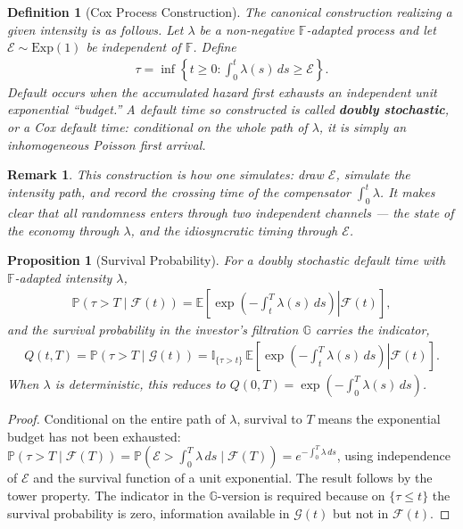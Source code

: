 \documentclass{report}
\theoremstyle{spacedplain}
\newtheorem{proposition}[theorem]{Proposition}
\theoremstyle{spaceddefinition}
\newtheorem{definition}[theorem]{Definition}
\theoremstyle{spacedremark}
\newtheorem{remark}[theorem]{Remark}
\begin{document}
\begin{definition}[Cox Process Construction]
    The canonical construction realizing a given intensity is as follows. Let $\lambda$ be a non-negative $\mathbb{F}$-adapted process and let $\mathcal{E}\sim\mathrm{Exp}(1)$ be independent of $\mathbb{F}$. Define
    \begin{align}
        \tau = \inf\left\{t \geq 0 : \int_0^t \lambda(s)\,ds \geq \mathcal{E}\right\}.
    \end{align}
    Default occurs when the accumulated hazard first exhausts an independent unit exponential ``budget.'' A default time so constructed is called \textbf{doubly stochastic}, or a \emph{Cox} default time: conditional on the whole path of $\lambda$, it is simply an inhomogeneous Poisson first arrival.
\end{definition}

\begin{remark}
    This construction is how one simulates: draw $\mathcal{E}$, simulate the intensity path, and record the crossing time of the compensator $\int_0^t\lambda$. It makes clear that all randomness enters through two independent channels --- the state of the economy through $\lambda$, and the idiosyncratic timing through $\mathcal{E}$.
\end{remark}

\begin{proposition}[Survival Probability]
    For a doubly stochastic default time with $\mathbb{F}$-adapted intensity $\lambda$,
    \begin{align}
        \mathbb{P}(\tau > T \mid \mathcal{F}(t)) = \mathbb{E}\!\left[\left. \exp\!\left(-\int_t^T \lambda(s)\,ds\right)\right| \mathcal{F}(t)\right],
    \end{align}
    and the survival probability in the investor's filtration $\mathbb{G}$ carries the indicator,
    \begin{align}
        Q(t,T) = \mathbb{P}(\tau > T\mid\mathcal{G}(t)) = \mathbb{I}_{\{\tau>t\}}\,\mathbb{E}\!\left[\left.\exp\!\left(-\int_t^T\lambda(s)\,ds\right)\right|\mathcal{F}(t)\right].
    \end{align}
    When $\lambda$ is deterministic, this reduces to $Q(0,T) = \exp\left(-\int_0^T\lambda(s)\,ds\right)$.
\end{proposition}
\begin{proof}
    Conditional on the entire path of $\lambda$, survival to $T$ means the exponential budget has not been exhausted: $\mathbb{P}(\tau > T \mid \mathcal{F}(T)) = \mathbb{P}\!\left(\mathcal{E} > \int_0^T\lambda\,ds \mid \mathcal{F}(T)\right) = e^{-\int_0^T\lambda\,ds}$, using independence of $\mathcal{E}$ and the survival function of a unit exponential. The result follows by the tower property. The indicator in the $\mathbb{G}$-version is required because on $\{\tau \leq t\}$ the survival probability is zero, information available in $\mathcal{G}(t)$ but not in $\mathcal{F}(t)$.
\end{proof}
\end{document}
